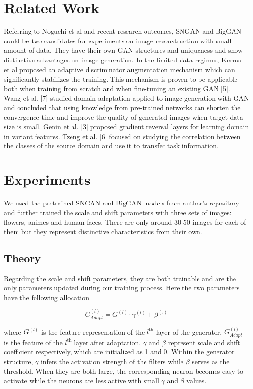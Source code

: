 \documentclass{article}
\begin{document}
\section{Related Work}
    Referring to Noguchi et al and recent research outcomes, SNGAN and BigGAN could be two candidates for experiments on image reconstruction with small amount of data. They have their own GAN structures and uniqueness and show distinctive advantages on image generation. In the limited data regimes, Kerras et al proposed an adaptive discriminator augmentation mechanism which can significantly stabilizes the training. This mechanism is proven to be applicable both when training from scratch and when fine-tuning an existing GAN [5]. Wang et al. [7] studied domain adaptation applied to image generation with GAN and concluded that using knowledge from pre-trained networks can shorten the convergence time and improve the quality of generated images when target data size is small. Genin et al. [3] proposed gradient reversal layers for learning domain in variant features. Tzeng et al. [6] focused on studying the correlation between the classes of the source domain and use it to transfer task information. 

\section{Experiments}
    We used the pretrained SNGAN and BigGAN models from author's repository and further trained the scale and shift parameters with three sets of images: flowers, animes and human faces. There are only around 30-50 images for each of them but they represent distinctive characteristics from their own. 
    
    \subsection{Theory}
    Regarding the scale and shift parameters, they are both trainable and are the only parameters updated during our training process. Here the two parameters have the following allocation: 
    \begin{center}
        \begin{equation*}
            G_{Adapt}^{(l)}=G^{(l)}\cdot\gamma^{(l)}+\beta^{(l)}
        \end{equation*}
    \end{center}
    where $G^{(l)}$ is the feature representation of the $l^{\text{th}}$ layer of the generator, $G_{Adapt}^{(l)}$ is the feature of the $l^{\text{th}}$ layer after adaptation. $\gamma$ and $\beta$ represent scale and shift coefficient respectively, which are initialized as 1 and 0. Within the generator structure, $\gamma$ infers the activation strength of the filters while $\beta$ serves as the threshold. When they are both large, the corresponding neuron becomes easy to activate while the neurons are less active with small $\gamma$ and $\beta$ values.
    
\end{document}
